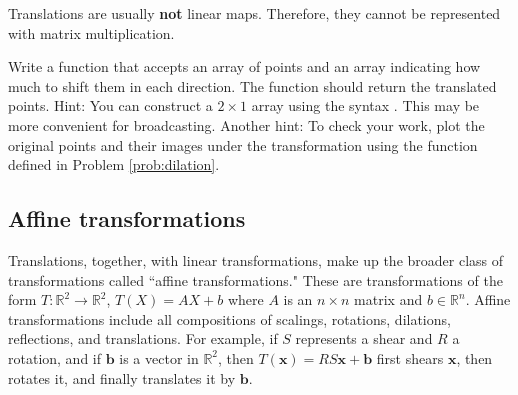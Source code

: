 Translations are usually \textbf{not} linear maps.
Therefore, they cannot be represented with matrix multiplication.

\begin{problem}
Write a function that accepts an array of points and an array indicating how much to shift them in each direction.
The function should return the translated points.
Hint: You can construct a $2 \times 1$ array using the syntax .
This may be more convenient for broadcasting.
Another hint: To check your work, plot the original points and their images under the transformation using the function  defined in Problem \ref{prob:dilation}.
\end{problem}

\subsection*{Affine transformations}
Translations, together, with linear transformations, make up the broader class of transformations called ``affine transformations."
These are transformations of the form $T: \mathbb{R}^2 \to \mathbb{R}^2$, $T(X) = AX + b$ where $A$ is an $n\times n$ matrix and $b \in \mathbb{R}^n$.
Affine transformations include all compositions of scalings, rotations, dilations, reflections, and translations.
For example, if $S$ represents a shear and $R$ a rotation, and if $\mathbf{b}$ is a vector in $\mathbb{R}^2$, then $T(\mathbf{x}) = RS\mathbf{x} + \mathbf{b}$ first shears $\mathbf{x}$, then rotates it, and finally translates it by $\mathbf{b}$.

